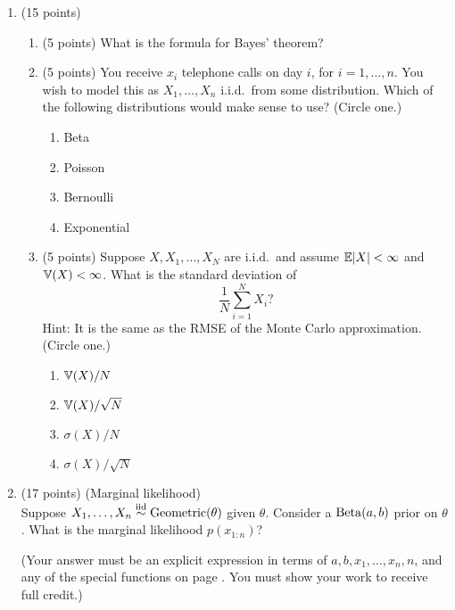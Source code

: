 \documentclass[12pt]{article}
\begin{document}
\normalsize

\newpage
\begin{enumerate}
\item (15 points)
    \begin{enumerate}
        \setlength\itemsep{4em}
        \item (5 points) What is the formula for Bayes' theorem?
        \item (5 points) You receive $x_i$ telephone calls on day $i$, for $i=1,\ldots,n$. 
            You wish to model this as $X_1,\ldots,X_n$ i.i.d.\ from some distribution.
            Which of the following distributions would make sense to use? (Circle one.)
            \vspace{1em}
            \begin{enumerate}
                \setlength\itemsep{1em}
                \item Beta
                \item Poisson
                \item Bernoulli
                \item Exponential
            \end{enumerate}
        \item (5 points) Suppose $X,X_1,\ldots,X_N$ are i.i.d.\ and assume $\mathbb{E}|X|<\infty$ and $\mathbb{V}(X)<\infty$.
            What is the standard deviation of $$\frac{1}{N}\sum_{i=1}^N X_i?$$
            Hint: It is the same as the RMSE of the Monte Carlo approximation. (Circle one.)
            \vspace{1em}
            \begin{enumerate}
                \setlength\itemsep{1em}
                \item $\mathbb{V}(X)/N$
                \item $\mathbb{V}(X)/\sqrt N$
                \item $\sigma(X)/N$
                \item $\sigma(X)/\sqrt N$
            \end{enumerate}
    \end{enumerate}

\newpage
\item (17 points) (Marginal likelihood)\\
    Suppose $X_1,\ldots,X_n\stackrel{\mathrm{iid}}{\sim}\operatorname*{Geometric}(\theta)$ given $\theta$. Consider a $\operatorname*{Beta}(a,b)$ prior on $\theta$. What is the
    marginal likelihood $p(x_{1:n})$?
    
    \vspace{1em}
    (Your answer must be an explicit expression in terms of $a,b,x_1,\ldots,x_n,n$, and any of the special
    functions on page \pageref{special-functions}. You must show your work to receive full credit.)


\end{enumerate}
\end{document}
